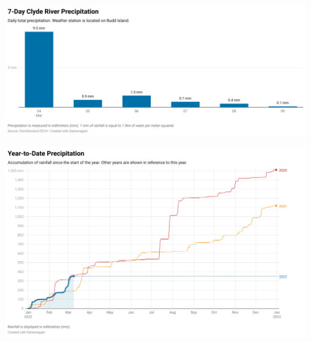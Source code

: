 \documentclass[10pt]{article}
\begin{document}
\begin{SidewaysFigure}
\centering
\includegraphics[width=1.3\textwidth]{weekly-precipitation.png}
\end{SidewaysFigure}
\vfill
\newpage

\begin{SidewaysFigure}
\centering
\includegraphics[width=1.3\textwidth]{yearly-precipitation.png}
\end{SidewaysFigure}
\vfill
\newpage
\end{document}

